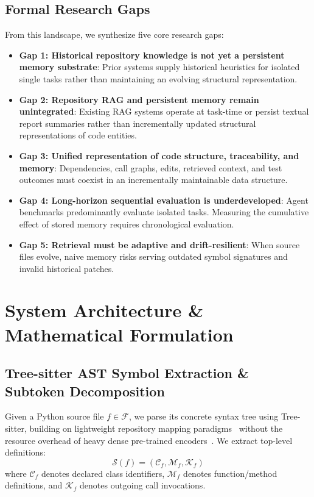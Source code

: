 \documentclass[conference]{IEEEtran}
\begin{document}
\subsection{Formal Research Gaps}
From this landscape, we synthesize five core research gaps:
\begin{itemize}
    \item \textbf{Gap 1: Historical repository knowledge is not yet a persistent memory substrate}: Prior systems supply historical heuristics for isolated single tasks rather than maintaining an evolving structural representation.
    \item \textbf{Gap 2: Repository RAG and persistent memory remain unintegrated}: Existing RAG systems operate at task-time or persist textual report summaries rather than incrementally updated structural representations of code entities.
    \item \textbf{Gap 3: Unified representation of code structure, traceability, and memory}: Dependencies, call graphs, edits, retrieved context, and test outcomes must coexist in an incrementally maintainable data structure.
    \item \textbf{Gap 4: Long-horizon sequential evaluation is underdeveloped}: Agent benchmarks predominantly evaluate isolated tasks. Measuring the cumulative effect of stored memory requires chronological evaluation.
    \item \textbf{Gap 5: Retrieval must be adaptive and drift-resilient}: When source files evolve, naive memory risks serving outdated symbol signatures and invalid historical patches.
\end{itemize}

\section{System Architecture \& Mathematical Formulation}

\subsection{Tree-sitter AST Symbol Extraction \& Subtoken Decomposition}
Given a Python source file $f \in \mathcal{F}$, we parse its concrete syntax tree using Tree-sitter, building on lightweight repository mapping paradigms~\cite{gauthier2023aider} without the resource overhead of heavy dense pre-trained encoders~\cite{feng2020codebert, guo2021graphcodebert}. We extract top-level definitions:
\begin{equation}
\mathcal{S}(f) = \left( \mathcal{C}_f, \mathcal{M}_f, \mathcal{K}_f \right)
\end{equation}
where $\mathcal{C}_f$ denotes declared class identifiers, $\mathcal{M}_f$ denotes function/method definitions, and $\mathcal{K}_f$ denotes outgoing call invocations.
\end{document}
